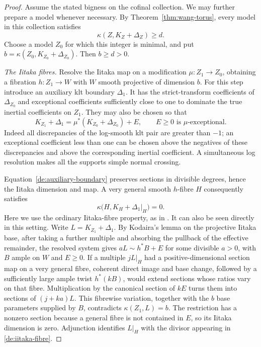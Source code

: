 \begin{proof}
Assume the stated bigness on the cofinal collection. We may further
prepare a model whenever necessary. By
Theorem~\ref{thm:wang-torus}, every model in this collection satisfies
\begin{equation}\label{de:minimum}
 \kappa(Z,K_Z+\Delta_Z)\ge d.
\end{equation}
Choose a model \(Z_0\) for which this integer is minimal, and put
\(b=\kappa(Z_0,K_{Z_0}+\Delta_{Z_0})\). Then \(b\ge d>0\).

\medskip\noindent
\emph{The Iitaka fibres.}
Resolve the Iitaka map on a modification \(\mu:Z_1\to Z_0\),
obtaining a fibration \(h:Z_1\to W\) with \(W\) smooth
projective of dimension \(b\). For this step introduce an auxiliary
klt boundary \(\Delta_1\). It has the strict-transform coefficients
of \(\Delta_{Z_0}\) and exceptional coefficients sufficiently close
to one to dominate the true inertial coefficients on \(Z_1\).
They may also be chosen so that
\begin{equation}\label{de:auxiliary-boundary}
 K_{Z_1}+\Delta_1
 =\mu^*(K_{Z_0}+\Delta_{Z_0})+E,
 \qquad E\ge0\text{ is }\mu\text{-exceptional}.
\end{equation}
Indeed all discrepancies of the log-smooth klt pair are greater than
\(-1\); an exceptional coefficient less than one can be chosen above
the negatives of these discrepancies and above the corresponding
inertial coefficient. A simultaneous log resolution makes all the
supports simple normal crossing.

Equation~\eqref{de:auxiliary-boundary} preserves sections in divisible
degrees, hence the Iitaka dimension and map. A very general smooth
\(h\)-fibre \(H\) consequently satisfies
\begin{equation}\label{de:iitaka-fibre}
 \kappa\bigl(H,K_H+\Delta_1|_H\bigr)=0.
\end{equation}
Here we use the ordinary Iitaka-fibre property, as in
\cite[Section~6.3]{JWang2021}. It can also be seen directly in this
setting. Write \(L=K_{Z_1}+\Delta_1\). By Kodaira's lemma on the projective
Iitaka base, after taking a further multiple and absorbing the
pullback of the effective remainder, the resolved system gives \(aL\sim h^*B+E\) for some divisible
\(a>0\), with \(B\) ample on \(W\) and \(E\ge0\). If a multiple \(jL|_H\) had a
positive-dimensional section map on a very general fibre, coherent
direct image and base change, followed by a sufficiently large ample
twist \(h^*(kB)\), would extend sections whose ratios vary on that
fibre. Multiplication by the canonical section of \(kE\) turns
them into sections of \((j+ka)L\). This fibrewise variation,
together with the \(b\) base parameters supplied by \(B\),
contradicts \(\kappa(Z_1,L)=b\). The restriction has a nonzero
section because a general fibre is not contained in \(E\), so its
Iitaka dimension is zero. Adjunction identifies \(L|_H\) with the
divisor appearing in \eqref{de:iitaka-fibre}.


\end{proof}
